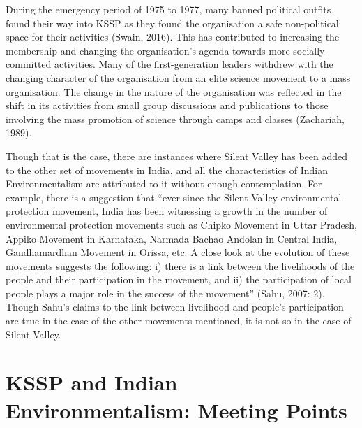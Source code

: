 \documentclass[twoside, 13pt]{article}
\begin{document}
{{During the emergency period of 1975 to 1977, many banned political outfits found their way into KSSP as they found the organisation a safe non-political space for their activities (Swain, 2016). This has contributed to increasing the membership and changing the organisation's agenda towards more socially committed activities. Many of the first-generation leaders withdrew with the changing character of the organisation from an elite science movement to a mass organisation. The change in the nature of the organisation was reflected in the shift in its activities from small group discussions and publications to those involving the mass promotion of science through camps and classes (Zachariah, 1989).

Though that is the case, there are instances where Silent Valley has been added to the other set of movements in India, and all the characteristics of Indian Environmentalism are attributed to it without enough contemplation. For example, there is a suggestion that “ever since the Silent Valley environmental protection movement, India has been witnessing a growth in the number of environmental protection movements such as Chipko Movement in Uttar Pradesh, Appiko Movement in Karnataka, Narmada Bachao Andolan in Central India, Gandhamardhan Movement in Orissa, etc. A close look at the evolution of these movements suggests the following: i) there is a link between the livelihoods of the people and their participation in the movement, and ii) the participation of local people plays a major role in the success of the movement” (Sahu, 2007: 2). Though Sahu’s claims to the link between livelihood and people’s participation are true in the case of the other movements mentioned, it is not so in the case of Silent Valley.}

\vspace{.2cm}

{\fontsize{18}{20}\selectfont\section*{KSSP and Indian Environmentalism: Meeting Points}}

\vspace{-.2cm}

}
\end{document}
